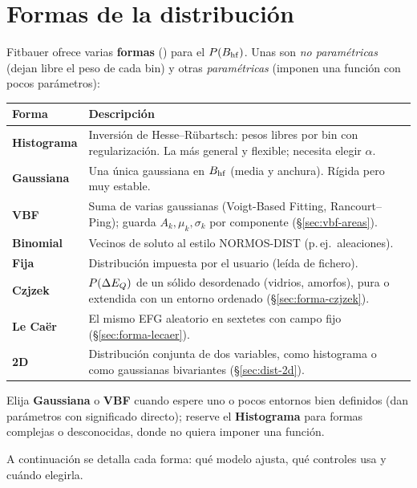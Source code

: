\section{Formas de la distribución}
\label{sec:formas-dist}

Fitbauer ofrece varias \textbf{formas} () para el $P(B_{\mathrm{hf}})$. Unas
son \emph{no paramétricas} (dejan libre el peso de cada bin) y otras
\emph{paramétricas} (imponen una función con pocos parámetros):

\begin{center}
\begin{tabular}{@{}lp{}@{}}
\toprule
\textbf{Forma} & \textbf{Descripción} \\
\midrule
\textbf{Histograma} & Inversión de Hesse--Rübartsch: pesos libres por bin con
regularización. La más general y flexible; necesita elegir $\alpha$. \\[3pt]
\textbf{Gaussiana} & Una única gaussiana en $B_{\mathrm{hf}}$ (media y anchura). Rígida pero
muy estable. \\[3pt]
\textbf{VBF} & Suma de varias gaussianas (Voigt-Based Fitting, Rancourt--Ping);
guarda $A_k, \mu_k, \sigma_k$ por componente (§\ref{sec:vbf-areas}). \\[3pt]
\textbf{Binomial} & Vecinos de soluto al estilo NORMOS-DIST (p.\,ej.\
aleaciones). \\[3pt]
\textbf{Fija} & Distribución impuesta por el usuario (leída de fichero). \\[3pt]
\textbf{Czjzek} & $P(\Delta E_{Q})$ de un sólido desordenado (vidrios, amorfos), pura o
extendida con un entorno ordenado (§\ref{sec:forma-czjzek}). \\[3pt]
\textbf{Le Caër} & El mismo EFG aleatorio en sextetes con campo fijo
(§\ref{sec:forma-lecaer}). \\[3pt]
\textbf{2D} & Distribución conjunta de dos variables, como histograma o como
gaussianas bivariantes (§\ref{sec:dist-2d}). \\
\bottomrule
\end{tabular}
\end{center}

\begin{truco}
Elija \textbf{Gaussiana} o \textbf{VBF} cuando espere uno o pocos entornos bien
definidos (dan parámetros con significado directo); reserve el \textbf{Histograma}
para formas complejas o desconocidas, donde no quiera imponer una función.
\end{truco}

A continuación se detalla cada forma: qué modelo ajusta, qué controles usa y
cuándo elegirla.

